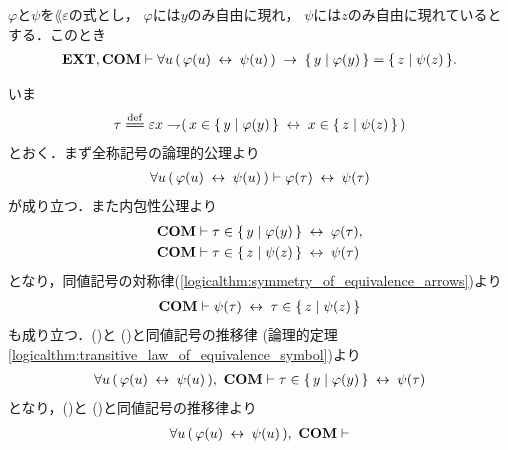 	\begin{screen}
		\begin{thm}
		\label{thm:equivalent_formula_rewriting_6}
			$\varphi$と$\psi$を$\lang{\varepsilon}$の式とし，
			$\varphi$には$y$のみ自由に現れ，
			$\psi$には$z$のみ自由に現れているとする．このとき
			\begin{align}
				\mbox{{\bf EXT}},\mbox{\bf COM} \vdash \forall u\, (\, \varphi(u) \hspace{0.25em}\leftrightarrow\hspace{0.25em} \psi(u)\, )
				\hspace{0.25em}\rightarrow\hspace{0.25em} \{\, y \mid \varphi(y)\, \} = \{\, z \mid \psi(z)\, \}.
			\end{align}
		\end{thm}
	\end{screen}
	
	\begin{sketch}
		いま
		\begin{align}
			\tau \defeq \varepsilon x \negation (\, x \in \Set{y}{\varphi(y)} \lrarrow x \in \Set{z}{\psi(z)}\, )
		\end{align}
		とおく．まず全称記号の論理的公理より
		\begin{align}
			\forall u\, (\, \varphi(u) \hspace{0.25em}\leftrightarrow\hspace{0.25em} \psi(u)\, )
			\vdash \varphi(\tau) \hspace{0.25em}\leftrightarrow\hspace{0.25em} \psi(\tau)
			\label{fom:equivalent_formula_rewriting_6_1}
		\end{align}
		が成り立つ．また内包性公理より
		\begin{align}
			\mbox{\bf COM} &\vdash \tau \in \{\, y \mid \varphi(y)\, \} \hspace{0.25em}\leftrightarrow\hspace{0.25em} \varphi(\tau), 
			\label{fom:equivalent_formula_rewriting_6_2} \\
			\mbox{\bf COM} &\vdash \tau \in \{\, z \mid \psi(z)\, \} \hspace{0.25em}\leftrightarrow\hspace{0.25em} \psi(\tau)
		\end{align}
		となり，同値記号の対称律(\ref{logicalthm:symmetry_of_equivalence_arrows})より
		\begin{align}
			\mbox{\bf COM} \vdash \psi(\tau) \hspace{0.25em}\leftrightarrow\hspace{0.25em} \tau \in \{\, z \mid \psi(z)\, \}
			\label{fom:equivalent_formula_rewriting_6_3}
		\end{align}
		も成り立つ．()と
		()と同値記号の推移律
		(論理的定理\ref{logicalthm:transitive_law_of_equivalence_symbol})より
		\begin{align}
			\forall u\, (\, \varphi(u) \hspace{0.25em}\leftrightarrow\hspace{0.25em} \psi(u)\, ),\ \mbox{\bf COM} \vdash
			\tau \in \{\, y \mid \varphi(y)\, \} \hspace{0.25em}\leftrightarrow\hspace{0.25em} \psi(\tau)
			\label{fom:equivalent_formula_rewriting_6_4}
		\end{align}
		となり，()と
		()と同値記号の推移律より
		\begin{align}
			\forall u\, (\, \varphi(u) \lrarrow \psi(u)\, ),\ \COMAX \vdash

\end{align}
\end{sketch}
